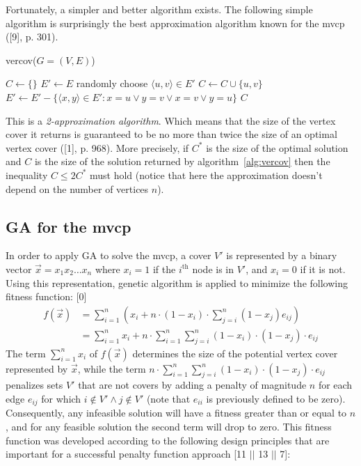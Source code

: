 \documentclass[12pt]{article}
\begin{document}
Fortunately, a simpler and better algorithm exists.
The following simple algorithm is surprisingly the
best approximation algorithm known for the mvcp ([9],
p. 301).

\begin{algorithm}
\caption{vercov($G = (V, E)$)}
\label{alg:vercov}
\begin{algorithmic}[1]

\State $C \gets \{ \}$
\State $E' \gets E$
\State randomly choose $ \langle u, v \rangle \in E'$
\label{alg:rand}
\State $C \gets C \cup \{u, v\}$
\State $E' \gets E' -
\{ \langle x, y \rangle \in E' : x=u \vee y=v \vee x=v \vee y=u \}$
\State {}
\EndWhile
\State \Return $C$

\end{algorithmic}
\end{algorithm}


This is a \textit{2-approximation algorithm}. Which means that
the size of the vertex cover
it returns is guaranteed to be no more than twice the
size of an optimal vertex cover ([1], p. 968).
More precisely, if $C^*$ is the size of the optimal
solution and $C$ is the size of the solution returned by algorithm~\ref{alg:vercov}
then the inequality $C \leq 2C^*$ must hold (notice that here the approximation
doesn't depend on the number of vertices $n$).

\subsection{GA for the mvcp}
\label{sec:GAmvcp}
In order to apply GA to solve the mvcp, a cover $V'$ is represented
by a binary vector $\vec{x} = x_1x_2 \dots x_n$ where $x_i = 1$ if
the $i^{\text{th}}$ node is in $V'$, and $x_i = 0$ if it is not.
Using this representation, genetic algorithm is applied to minimize the following
fitness function: [0] \\
\begin{equation}
\label{eq:f}
\begin{split}
f(\vec{x})	&= \sum_{i=1}^{n} \left( x_i+n \cdot (1-x_i) \cdot
			   \sum_{j=i}^{n} (1-x_j) e_{ij} \right) \\
 			&= \sum_{i=1}^{n} x_i + n \cdot \sum_{i=1}^{n}
			   \sum_{j=i}^{n} (1-x_i) \cdot (1-x_j) \cdot e_{ij}
\end{split}
\end{equation}
The term $ \sum_{i=1}^{n} x_i $ of $ f(\vec{x}) $ determines the size of the
potential vertex cover represented by $\vec{x}$, while the term
$ n \cdot \sum_{i=1}^{n} \sum_{j=i}^{n} (1-x_i) \cdot (1-x_j) \cdot e_{ij} $
penalizes sets $V'$ that
are not covers by adding a penalty of magnitude $n$ for
each edge $e_{ij}$ for which $i \notin V' \wedge j \notin V'$
(note that $e_{ii}$ is previously defined to be zero).
Consequently, any infeasible solution will have a fitness greater than
or equal to $n$, and for any feasible solution the second term will
drop to zero.
This fitness function was developed according to the
following design principles that are important for a
successful penalty function approach [11 $||$ 13 $||$ 7]:
\end{document}
